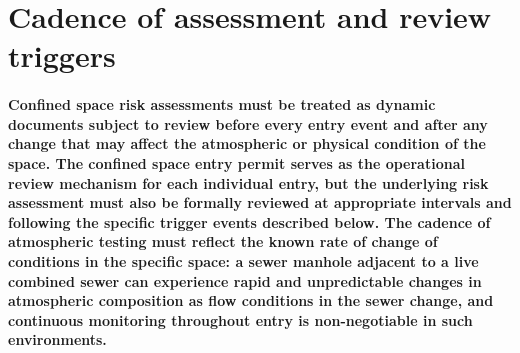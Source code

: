 \section{Cadence of assessment and review triggers}

\paragraph{Confined space risk assessments must be treated as dynamic documents subject to review before every entry event and after any change that may affect the atmospheric or physical condition of the space. The confined space entry permit serves as the operational review mechanism for each individual entry, but the underlying risk assessment must also be formally reviewed at appropriate intervals and following the specific trigger events described below. The cadence of atmospheric testing must reflect the known rate of change of conditions in the specific space: a sewer manhole adjacent to a live combined sewer can experience rapid and unpredictable changes in atmospheric composition as flow conditions in the sewer change, and continuous monitoring throughout entry is non-negotiable in such environments.}

